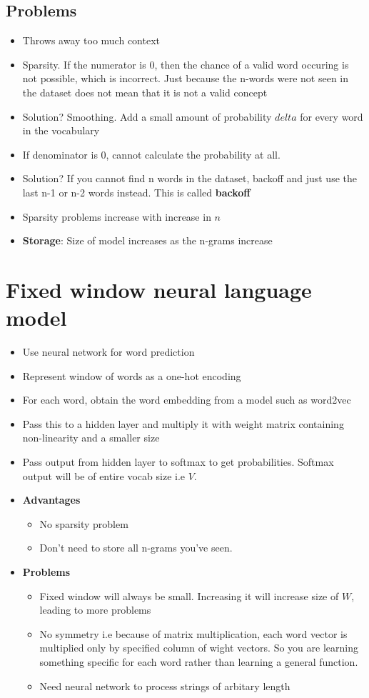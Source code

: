 \documentclass[a4paper]{article}
\begin{document}
\subsection{Problems}
\begin{itemize}
    \item Throws away too much context
    \item Sparsity. If the numerator is 0, then the chance of a valid word occuring is not possible, which is incorrect. Just because the n-words were not seen in the dataset does not mean that it is not a valid concept
    \item Solution? Smoothing. Add a small amount of probability $delta$ for every word in the vocabulary
    \item If denominator is 0, cannot calculate the probability at all.
    \item Solution? If you cannot find n words in the dataset, backoff and just use the last n-1 or n-2 words instead. This is called \textbf{backoff}  
    \item Sparsity problems increase with increase in $n$
    \item \textbf{Storage}: Size of model increases as the n-grams increase
\end{itemize}

\section{Fixed window neural language model}
\begin{itemize}
    \item Use neural network for word prediction
    \item Represent window of words as a one-hot encoding
    \item For each word, obtain the word embedding from a model such as word2vec
    \item Pass this to a hidden layer and multiply it with weight matrix containing non-linearity and a smaller size
    \item Pass output from hidden layer to softmax to get probabilities. Softmax output will be of entire vocab size i.e $V$.
    \item \textbf{Advantages} 
    \begin{itemize}
        \item No sparsity problem
        \item Don't need to store all n-grams you've seen.
    \end{itemize}
    \item \textbf{Problems} 
    \begin{itemize}
        \item Fixed window will always be small. Increasing it will increase size of $W$, leading to more problems
        \item No symmetry i.e because of matrix multiplication, each word vector is multiplied only by specified column of wight vectors. So you are learning something specific for each word rather than learning a general function.
        \item Need neural network to process strings of arbitary length
    \end{itemize}
\end{itemize}
\end{document}
